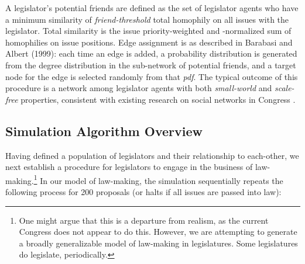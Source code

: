 \documentclass[pdftex,12pt]{llncs}
\begin{document}
A legislator's potential friends are defined as the set of legislator agents who have a minimum similarity of \textit{friend-threshold} total homophily on all issues with the legislator.  Total similarity is the issue priority-weighted and -normalized sum of homophilies on issue positions.
Edge assignment is as described in Barabasi and Albert (1999): each time an edge is added, a probability distribution is generated from the degree distribution in the sub-network of potential friends, and a target node for the edge is selected randomly from that \textit{pdf}. 
The typical outcome of this procedure is a network among legislator agents with both \textit{small-world} and \textit{scale-free} properties, consistent with existing research on social networks in Congress \parencite{Granovetter1978}.

\subsection{Simulation Algorithm Overview}
Having defined a population of legislators and their relationship to each-other, we next establish a procedure for legislators to engage in the business of law-making.\footnote{One might argue that this is a departure from realism, as the current Congress does not appear to do this. However, we are attempting to generate a broadly generalizable model of law-making in legislatures. Some legislatures do legislate, periodically.}  In our model of law-making, the simulation sequentially repeats the following process for 200 proposals (or halts if all issues are passed into law): 
\end{document}
